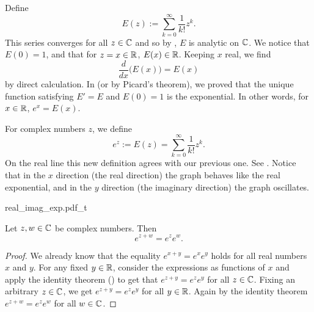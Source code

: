 Define
\begin{equation*}
E(z) := \sum_{k=0}^\infty \frac{1}{k!} z^k .
\end{equation*}
This series converges for all $z \in {\mathbb{C}}$ and so by
, $E$ is analytic on ${\mathbb{C}}$.   We notice that $E(0) = 1$,
and that for $z=x \in {\mathbb{R}}$, $E(x) \in {\mathbb{R}}$.  Keeping $x$ real, we find
\begin{equation*}
\frac{d}{dx} \bigl( E(x) \bigr) = E(x)
\end{equation*}
by direct calculation.
In  (or by Picard's theorem), we proved that
the unique function satisfying $E' = E$ and
$E(0) = 1$ is the exponential.  In other words, for $x \in {\mathbb{R}}$, $e^x = E(x)$.

For complex numbers $z$, we define
\begin{equation*}
e^z := E(z) = 
\sum_{k=0}^\infty \frac{1}{k!} z^k .
\end{equation*}
On the real line this new definition agrees with our previous one.
See .  Notice that in the $x$ direction
(the real direction)
the graph behaves like the real exponential, and in the $y$ direction
(the imaginary direction) the graph oscillates.

\begin{myfigureht}
{real_imag_exp.pdf_t}
\caption{Graphs of the real part (left) and imaginary part (right)
of the complex exponential $e^z = e^{x+iy}$.  The $x$-axis goes from $-4$ to
$4$, the $y$-axis goes from $-6$ to $6$, and the vertical axis goes from
$-e^{4} \approx -54.6$
to
$e^{4} \approx 54.6$.  The plot of the real exponential ($y=0$)
is marked in a bold line.\label{fig:complexexpgraphs}}
\end{myfigureht}

\begin{prop}
Let $z,w \in {\mathbb{C}}$ be complex numbers.  Then
\begin{equation*}
e^{z+w} = e^z e^w.
\end{equation*}
\end{prop}

\begin{proof}
We already know that
the equality
$e^{x+y} = e^x e^y$ holds for all
real numbers $x$ and $y$.
For any fixed $y \in {\mathbb{R}}$, consider the expressions as
functions of $x$ and apply the identity theorem
() to get that
$e^{z+y} = e^ze^y$ for all $z \in {\mathbb{C}}$.  Fixing an arbitrary $z \in {\mathbb{C}}$,
we get
$e^{z+y} = e^ze^y$ for all $y \in {\mathbb{R}}$.  Again by the identity theorem 
$e^{z+w} = e^z e^w$
for all $w \in {\mathbb{C}}$.
\end{proof}

